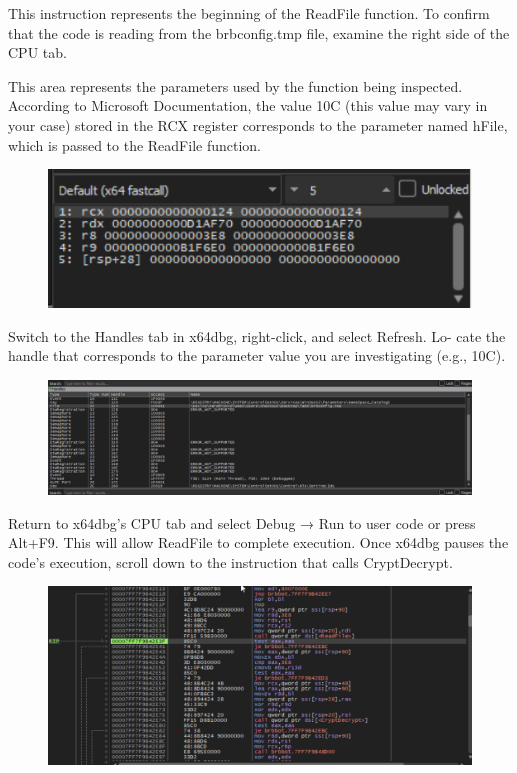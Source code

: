 \documentclass[]{project_plan}
\begin{document}
This instruction represents the beginning of the ReadFile function.
To confirm that the code is reading from the brbconfig.tmp file, examine
the right side of the CPU tab.


This area represents the parameters used by the function being inspected.
According to Microsoft Documentation, the value 10C (this value may vary in
your case) stored in the RCX register corresponds to the parameter named hFile,
which is passed to the ReadFile function.

\begin{figure}[H]
  \centering
  \includegraphics[width=\linewidth]{124 10c.png}
\end{figure}

Switch to the Handles tab in x64dbg, right-click, and select Refresh. Lo-
cate the handle that corresponds to the parameter value you are investigating
(e.g., 10C).

\begin{figure}[H]
  \centering
  \includegraphics[width=\linewidth]{124 file.png}
\end{figure}

Return to x64dbg’s CPU tab and select Debug → Run to user code or
press Alt+F9. This will allow ReadFile to complete execution. Once x64dbg
pauses the code’s execution, scroll down to the instruction that calls CryptDecrypt.

\begin{figure}[H]
  \centering
  \includegraphics[width=\linewidth]{cryptDecrypt.png}
\end{figure}
\end{document}

